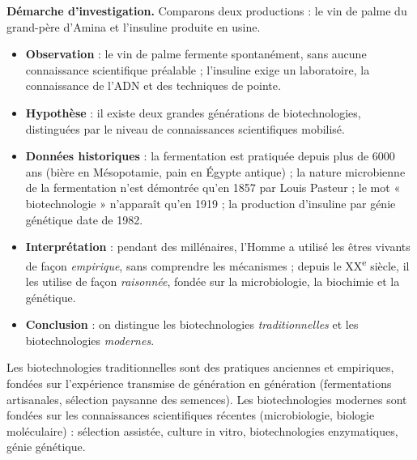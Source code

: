 \documentclass[11pt]{article}
\newcommand{\cle}[1]{{\popxbold\color{popdark}#1}}
\begin{document}
\textbf{Démarche d'investigation.} Comparons deux productions : le vin de palme du grand-père d'Amina et l'insuline produite en usine.
\begin{itemize}
\item \textbf{Observation} : le vin de palme fermente spontanément, sans aucune connaissance scientifique préalable ; l'insuline exige un laboratoire, la connaissance de l'ADN et des techniques de pointe.
\item \textbf{Hypothèse} : il existe deux grandes générations de biotechnologies, distinguées par le niveau de connaissances scientifiques mobilisé.
\item \textbf{Données historiques} : la fermentation est pratiquée depuis plus de 6000 ans (bière en Mésopotamie, pain en Égypte antique) ; la nature microbienne de la fermentation n'est démontrée qu'en 1857 par Louis Pasteur ; le mot « biotechnologie » n'apparaît qu'en 1919 ; la production d'insuline par génie génétique date de 1982.
\item \textbf{Interprétation} : pendant des millénaires, l'Homme a utilisé les êtres vivants de façon \emph{empirique}, sans comprendre les mécanismes ; depuis le XX\textsuperscript{e} siècle, il les utilise de façon \emph{raisonnée}, fondée sur la microbiologie, la biochimie et la génétique.
\item \textbf{Conclusion} : on distingue les biotechnologies \emph{traditionnelles} et les biotechnologies \emph{modernes}.
\end{itemize}

\begin{definition}
Les \cle{biotechnologies traditionnelles} sont des pratiques anciennes et empiriques, fondées sur l'expérience transmise de génération en génération (fermentations artisanales, sélection paysanne des semences). Les \cle{biotechnologies modernes} sont fondées sur les connaissances scientifiques récentes (microbiologie, biologie moléculaire) : sélection assistée, culture in vitro, biotechnologies enzymatiques, génie génétique.
\end{definition}
\end{document}
